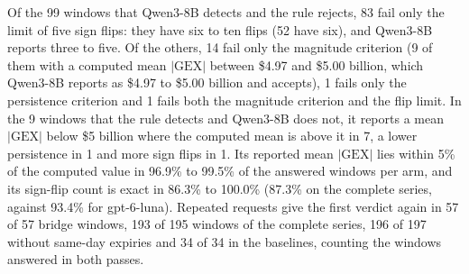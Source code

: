 Of the 99 windows that Qwen3-8B detects and the rule rejects, 83 fail only the limit of five sign flips: they have six to ten flips (52 have six), and Qwen3-8B reports three to five. Of the others, 14 fail only the magnitude criterion (9 of them with a computed mean $|\mathrm{GEX}|$ between \$4.97 and \$5.00 billion, which Qwen3-8B reports as \$4.97 to \$5.00 billion and accepts), 1 fails only the persistence criterion and 1 fails both the magnitude criterion and the flip limit. In the 9 windows that the rule detects and Qwen3-8B does not, it reports a mean $|\mathrm{GEX}|$ below \$5 billion where the computed mean is above it in 7, a lower persistence in 1 and more sign flips in 1. Its reported mean $|\mathrm{GEX}|$ lies within 5\% of the computed value in 96.9\% to 99.5\% of the answered windows per arm, and its sign-flip count is exact in 86.3\% to 100.0\% (87.3\% on the complete series, against 93.4\% for gpt-6-luna). Repeated requests give the first verdict again in 57 of 57 bridge windows, 193 of 195 windows of the complete series, 196 of 197 without same-day expiries and 34 of 34 in the baselines, counting the windows answered in both passes.

